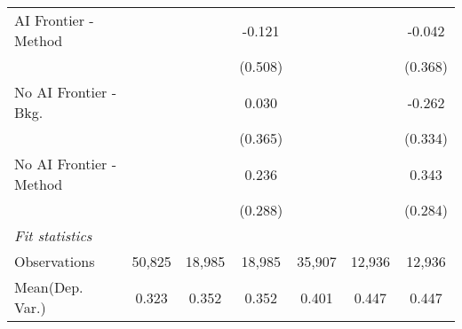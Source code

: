 \begin{tabular}{lcccccc}
   AI Frontier - Method    &               &               & -0.121        &               &               & -0.042\\   
                           &               &               & (0.508)       &               &               & (0.368)\\   
   No AI Frontier - Bkg.   &               &               & 0.030         &               &               & -0.262\\   
                           &               &               & (0.365)       &               &               & (0.334)\\   
   No AI Frontier - Method &               &               & 0.236         &               &               & 0.343\\   
                           &               &               & (0.288)       &               &               & (0.284)\\   
   \midrule
   \emph{Fit statistics}\\
   Observations            & 50,825        & 18,985        & 18,985        & 35,907        & 12,936        & 12,936\\  
Mean(Dep. Var.) & 0.323 & 0.352 & 0.352 & 0.401 & 0.447 & 0.447 \\
   

\end{tabular}
